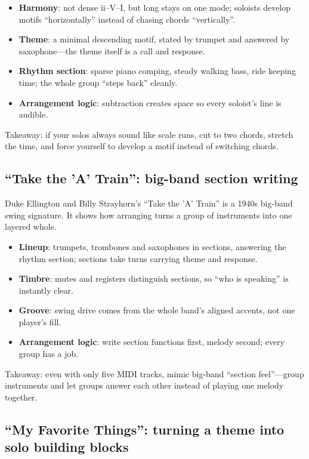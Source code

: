 \begin{itemize}
\item \textbf{Harmony}: not dense ii--V--I, but long stays on one mode; soloists develop motifs ``horizontally'' instead of chasing chords ``vertically''.
\item \textbf{Theme}: a minimal descending motif, stated by trumpet and answered by saxophone---the theme itself is a call and response.
\item \textbf{Rhythm section}: sparse piano comping, steady walking bass, ride keeping time; the whole group ``steps back'' cleanly.
\item \textbf{Arrangement logic}: subtraction creates space so every soloist's line is audible.
\end{itemize}

Takeaway: if your solos always sound like scale runs, cut to two chords, stretch the time, and force yourself to develop a motif instead of switching chords.

\subsection{``Take the 'A' Train'': big-band section writing}
\label{sec:jazz-case-a-train}

Duke Ellington and Billy Strayhorn's ``Take the 'A' Train'' is a 1940s big-band swing signature. It shows how arranging turns a group of instruments into one layered whole.

\begin{itemize}
\item \textbf{Lineup}: trumpets, trombones and saxophones in sections, answering the rhythm section; sections take turns carrying theme and response.
\item \textbf{Timbre}: mutes and registers distinguish sections, so ``who is speaking'' is instantly clear.
\item \textbf{Groove}: swing drive comes from the whole band's aligned accents, not one player's fill.
\item \textbf{Arrangement logic}: write section functions first, melody second; every group has a job.
\end{itemize}

Takeaway: even with only five MIDI tracks, mimic big-band ``section feel''---group instruments and let groups answer each other instead of playing one melody together.

\subsection{``My Favorite Things'': turning a theme into solo building blocks}
\label{sec:jazz-case-favorite-things}


